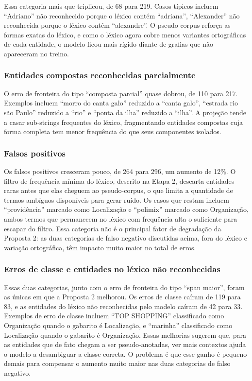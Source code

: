 \documentclass[12pt,a4paper]{article}
\begin{document}
Essa categoria mais que triplicou, de 68 para 219. Casos típicos incluem
``Adriano'' não reconhecido porque o léxico contém ``adriana'', ``Alexander''
não reconhecida porque o léxico contém ``alexandre''. O pseudo-corpus reforça as
formas exatas do léxico, e como o léxico agora cobre menos variantes
ortográficas de cada entidade, o modelo ficou mais rígido diante de grafias
que não apareceram no treino.

\subsubsection{Entidades compostas reconhecidas parcialmente}

O erro de fronteira do tipo ``composta parcial'' quase dobrou, de 110 para
217. Exemplos incluem ``morro do canta galo'' reduzido a ``canta galo'',
``estrada rio são Paulo'' reduzido a ``rio'' e ``ponta da ilha'' reduzido a
``ilha''. A projeção tende a casar sub-strings frequentes do léxico,
fragmentando entidades compostas cuja forma completa tem menor frequência do
que seus componentes isolados.

\subsubsection{Falsos positivos}

Os falsos positivos cresceram pouco, de 264 para 296, um aumento de 12\%. O
filtro de frequência mínima do léxico, descrito na Etapa 2, descarta
entidades raras antes que elas cheguem ao pseudo-corpus, o que limita a
quantidade de termos ambíguos disponíveis para gerar ruído. Os casos que
restam incluem ``providência'' marcado como Localização e ``polimix''
marcado como Organização, ambos termos que permanecem no léxico com
frequência alta o suficiente para escapar do filtro. Essa categoria não é o
principal fator de degradação da Proposta 2: as duas categorias de falso
negativo discutidas acima, fora do léxico e variação ortográfica, têm impacto
muito maior no total de erros.

\subsubsection{Erros de classe e entidades no léxico não reconhecidas}

Essas duas categorias, junto com o erro de fronteira do tipo ``span maior'',
foram as únicas em que a Proposta 2 melhorou. Os erros de classe caíram de
119 para 83, e as entidades do léxico não reconhecidas pelo modelo caíram de
42 para 33. Exemplos de erro de classe incluem ``TOP SHOPPING'' classificado
como Organização quando o gabarito é Localização, e ``marinha'' classificado
como Localização quando o gabarito é Organização. Essas melhorias sugerem que,
para as entidades que de fato chegam a ser pseudo-anotadas, ver mais contextos
ajuda o modelo a desambiguar a classe correta. O problema é que esse ganho é
pequeno demais para compensar o aumento muito maior nas duas categorias de
falso negativo.
\end{document}
